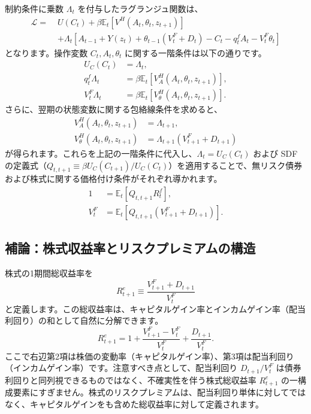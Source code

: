 \documentclass[
  japanese,
  lualatex,
  ja=standard,
  12pt,
  a4paper]{ltjsarticle}
\begin{document}
制約条件に乗数 \(\Lambda_t\) を付与したラグランジュ関数は、 \[
\begin{aligned}
\mathcal{L} =\;& U(C_t) + \beta \mathbb{E}_t \left[ V^H(A_t, \theta_t, z_{t+1}) \right] \\
&+ \Lambda_t \left[ A_{t-1} + Y(z_t) + \theta_{t-1} (V_t^F + D_t) - C_t - q_t^f A_t - V_t^F \theta_t \right]
\end{aligned}
\] となります。操作変数 \(C_t, A_t, \theta_t\)
に関する一階条件は以下の通りです。 \[
\begin{aligned}
U_C(C_t) &= \Lambda_t,\\
q_t^f \Lambda_t &= \beta \mathbb{E}_t \left[ V^H_A(A_t, \theta_t, z_{t+1}) \right],\\
V_t^F \Lambda_t &= \beta \mathbb{E}_t \left[ V^H_{\theta}(A_t, \theta_t, z_{t+1}) \right].
\end{aligned}
\] さらに、翌期の状態変数に関する包絡線条件を求めると、 \[
\begin{aligned}
V^H_A(A_t, \theta_t, z_{t+1}) &= \Lambda_{t+1},\\
V^H_{\theta}(A_t, \theta_t, z_{t+1}) &= \Lambda_{t+1} (V_{t+1}^F + D_{t+1})
\end{aligned}
\]
が得られます。これらを上記の一階条件に代入し、\(\Lambda_t = U_C(C_t)\)
および SDF
の定義式（\(Q_{t,t+1} \equiv \beta U_C(C_{t+1})/U_C(C_t)\)）を適用することで、無リスク債券および株式に関する価格付け条件がそれぞれ導かれます。
\[
\begin{aligned}
1 &= \mathbb{E}_t \left[ Q_{t,t+1} R_t^f \right],\\
V_t^F &= \mathbb{E}_t \left[ Q_{t,t+1} (V_{t+1}^F + D_{t+1}) \right].
\end{aligned}
\]

\subsection{補論：株式収益率とリスクプレミアムの構造}\label{ux88dcux8ad6ux682aux5f0fux53ceux76caux7387ux3068ux30eaux30b9ux30afux30d7ux30ecux30dfux30a2ux30e0ux306eux69cbux9020}

株式の1期間総収益率を \[
R_{t+1}^e \equiv \frac{V_{t+1}^F + D_{t+1}}{V_t^F}
\]
と定義します。この総収益率は、キャピタルゲイン率とインカムゲイン率（配当利回り）の和として自然に分解できます。
\[
R_{t+1}^e = 1 + \frac{V_{t+1}^F - V_t^F}{V_t^F} + \frac{D_{t+1}}{V_t^F}.
\]
ここで右辺第2項は株価の変動率（キャピタルゲイン率）、第3項は配当利回り（インカムゲイン率）です。注意すべき点として、配当利回り
\(D_{t+1}/V_t^F\)
は債券利回りと同列視できるものではなく、不確実性を伴う株式総収益率
\(R_{t+1}^e\)
の一構成要素にすぎません。株式のリスクプレミアムは、配当利回り単体に対してではなく、キャピタルゲインをも含めた総収益率に対して定義されます。
\end{document}
